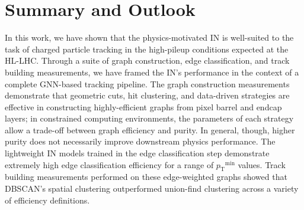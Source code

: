 \documentclass[twocolumn]{svjour3}
\newcommand{\pt}{\ensuremath{p_{\mathrm{T}}}\xspace}
\begin{document}


\section{Summary and Outlook}
\label{sec:summary}
In this work, we have shown that the physics-motivated IN is well-suited to the task of charged particle tracking in the high-pileup conditions expected at the HL-LHC. 
Through a suite of graph construction, edge classification, and track building measurements, we have framed the IN's performance in the context of a complete GNN-based tracking pipeline. 
The graph construction measurements demonstrate that geometric cuts, hit clustering, and data-driven strategies are effective in constructing highly-efficient graphs from pixel barrel and endcap layers; in constrained computing environments, the parameters of each strategy allow a trade-off between graph efficiency and purity. 
In general, though, higher purity does not necessarily improve downstream physics performance. %
The lightweight IN models trained in the edge classification step demonstrate extremely high edge classification efficiency for a range of $\pt^\mathrm{min}$ values. 
Track building measurements performed on these edge-weighted graphs showed that DBSCAN's spatial clustering outperformed union-find clustering across a variety of efficiency definitions.
\end{document}
